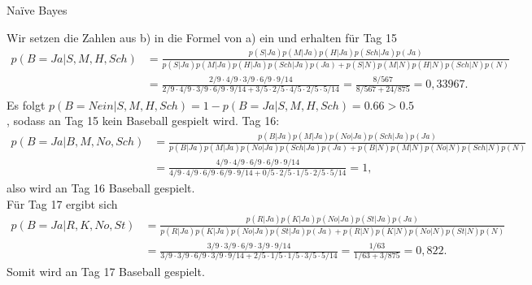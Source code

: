 \begin{task}[credit=19]{Na\"ive Bayes}
\begin{subtask}[points=9,title=Vorhersage]
\begin{solution}
Wir setzen die Zahlen aus b) in die Formel von a) ein und erhalten für Tag 15\begin{align*}
 p(B = Ja| S, M, H, Sch) &= \frac{p(S|Ja)p(M|Ja)p(H|Ja)p(Sch|Ja)p(Ja)}{p(S|Ja)p(M|Ja)p(H|Ja)p(Sch|Ja)p(Ja) + p(S|N)p(M|N)p(H|N)p(Sch|N)p(N)} \\
&= \frac{2/9\cdot4/9\cdot3/9\cdot6/9\cdot9/14}{2/9\cdot4/9\cdot3/9\cdot6/9\cdot9/14 + 3/5\cdot2/5\cdot4/5\cdot2/5\cdot5/14} = \frac{8/567}{8/567 + 24/875} = 0,33967.
\end{align*} Es folgt $p(B = Nein| S, M, H, Sch) = 1- p(B = Ja| S, M, H, Sch) = 0.66 > 0.5$, sodass an Tag 15 kein Baseball gespielt wird. Tag 16: \begin{align*}
p(B = Ja| B, M, No, Sch) &= \frac{p(B|Ja)p(M|Ja)p(No|Ja)p(Sch|Ja)p(Ja)}{p(B|Ja)p(M|Ja)p(No|Ja)p(Sch|Ja)p(Ja) + p(B|N)p(M|N)p(No|N)p(Sch|N)p(N)} \\ &= \frac{4/9\cdot4/9\cdot6/9\cdot6/9\cdot9/14}{4/9\cdot4/9\cdot6/9\cdot6/9\cdot9/14 + 0/5\cdot2/5\cdot1/5\cdot2/5\cdot5/14} = 1,
\end{align*} also wird an Tag 16 Baseball gespielt. \\ Für Tag 17 ergibt sich \begin{align*}
p(B = Ja| R, K, No, St) &= \frac{p(R|Ja)p(K|Ja)p(No|Ja)p(St|Ja)p(Ja)}{p(R|Ja)p(K|Ja)p(No|Ja)p(St|Ja)p(Ja) + p(R|N)p(K|N)p(No|N)p(St|N)p(N)} \\
&= \frac{3/9\cdot3/9\cdot6/9\cdot3/9\cdot9/14}{3/9\cdot3/9\cdot6/9\cdot3/9\cdot9/14 + 2/5\cdot1/5\cdot1/5\cdot3/5\cdot5/14} = \frac{1/63}{1/63 + 3/875} = 0,822.
\end{align*} Somit wird an Tag 17 Baseball gespielt. 
\end{solution}

\end{subtask}
\end{task}
